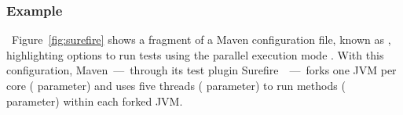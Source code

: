 \subsubsection*{Example}~Figure~\ref{fig:surefire} shows a
fragment of a Maven configuration file, known as \pomf{}, highlighting
options to run tests using the parallel execution mode \ForkParMeth{}.
With this configuration, Maven~---~through its test plugin
Surefire~\cite{maven-surefire-plugin}~---~forks one JVM per core
( parameter) and uses five threads
( parameter) to run methods (
parameter) within each forked JVM.

